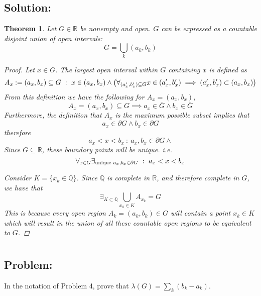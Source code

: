 \documentclass[]{article}
\newcommand{\R}{\mathbb{R}}
\newcommand{\Q}{\mathbb{Q}}
\newcommand{\st}{\ : \ }
\newtheorem{theorem}{Theorem}
\begin{document}
\subsection*{Solution:}
\begin{theorem} \label{thm:pblm4}
    Let $G \in \R$ be nonempty and open. 
    $G$ can be expressed as a countable disjoint union of open intervals: \[
        G = \bigcup_{k} (a_k, b_k)
    \]
    \begin{proof}
        Let $x \in G$. 
        The largest open interval within $G$ containing $x$ is defined as \[
            A_x := (a_x,b_x) \subseteq G 
                \st x \in (a_x,b_x)
                \land \qty(
                    \forall_{(a_x',b_x') \subseteq G} x \in (a_x',b_x') \implies (a_x',b_x') \subset (a_x,b_x)
                )
        \] From this definition we have the following for $A_x = (a_x, b_x)$, \[
            A_x = (a_x, b_x) \subseteq G \implies a_x \in \overline{G} \land b_x \in \overline{G}
        \] Furthermore, the definition that $A_x$ is the maximum possible subset implies that \[
            a_x \in \partial G \land b_x \in \partial G
        \] therefore \[
            a_x < x < b_x \st a_x, b_x \in \partial G \land 
        \] Since $G \subseteq \R$, these boundary points will be unique. 
        i.e. \[
            \forall_{x \in G} \exists_{\textnormal{unique }a_x, b_x \in \partial G} \st a_x < x < b_x
        \] 

        Consider $K = \{x_k \in \Q\}$. 
        Since $\Q$ is complete in $\R$, and therefore complete in $G$, we have that \[
            \exists_{K \subset \Q} \bigcup_{x_k \in K} A_{x_k} = G
        \]
        This is because every open region $A_k = (a_k,b_k) \in G$ will contain a point $x_k \in K$ which will result in the union of all these countable open regions to be equivalent to $G$.
    \end{proof}
\end{theorem}

\newpage
\section{}
\subsection*{Problem:}
In the notation of Problem 4, prove that $\lambda(G) = \sum_{k} (b_k - a_k)$.
\end{document}
